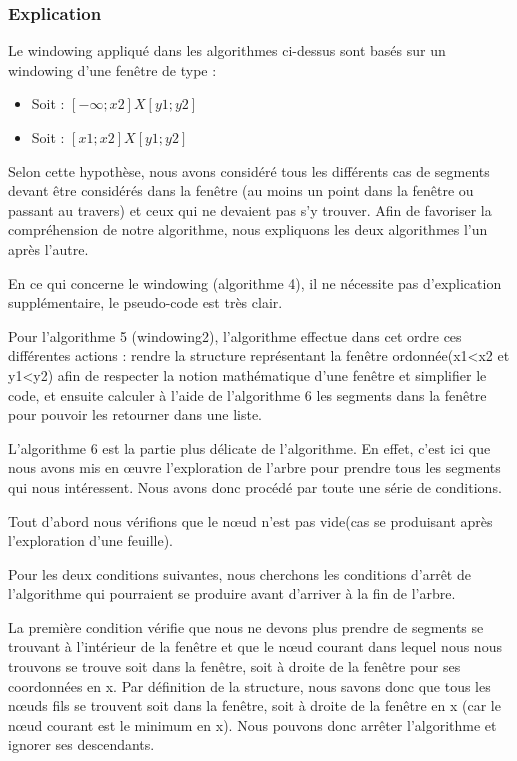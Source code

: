 \documentclass[10pt,a4paper]{article}
\begin{document}
\subsubsection{Explication}

Le windowing appliqué dans les algorithmes ci-dessus sont basés sur un windowing d'une fenêtre de type : \begin{itemize}
\item Soit : $[-\infty;x2]X[y1;y2]$
\item Soit : $[x1;x2]X[y1;y2]$
\end{itemize}
Selon cette hypothèse, nous avons considéré tous les différents cas de segments devant être considérés dans la fenêtre (au moins un point dans la fenêtre ou passant au travers) et ceux qui ne devaient pas s'y trouver. Afin de favoriser la compréhension de notre algorithme, nous expliquons les deux algorithmes l'un après l'autre.

En ce qui concerne le windowing (algorithme 4), il ne nécessite pas d'explication supplémentaire, le pseudo-code est très clair.

Pour l'algorithme 5 (windowing2), l'algorithme effectue dans cet ordre ces différentes actions : rendre la structure représentant la fenêtre ordonnée(x1<x2 et y1<y2) afin de respecter la notion mathématique d'une fenêtre et simplifier le code, et ensuite calculer à l'aide de l'algorithme 6 les segments dans la fenêtre pour pouvoir les retourner dans une liste.

L'algorithme 6 est la partie plus délicate de l'algorithme. En effet, c'est ici que nous avons mis en œuvre l'exploration de l'arbre pour prendre tous les segments qui nous intéressent. Nous avons donc procédé par toute une série de conditions.

Tout d'abord nous vérifions que le nœud n'est pas vide(cas se produisant après l'exploration d'une feuille).

Pour les deux conditions suivantes, nous cherchons les conditions d'arrêt de l'algorithme qui pourraient se produire avant d'arriver à la fin de l'arbre.

La première condition vérifie que nous ne devons plus prendre de segments se trouvant à l'intérieur de la fenêtre et que le nœud courant dans lequel nous nous trouvons se trouve soit dans la fenêtre, soit à droite de la fenêtre pour ses coordonnées en x. Par définition de la structure, nous savons donc que tous les nœuds fils se trouvent soit dans la fenêtre, soit à droite de la fenêtre en x (car le nœud courant est le minimum en x). Nous pouvons donc arrêter l'algorithme et ignorer ses descendants.
\end{document}

